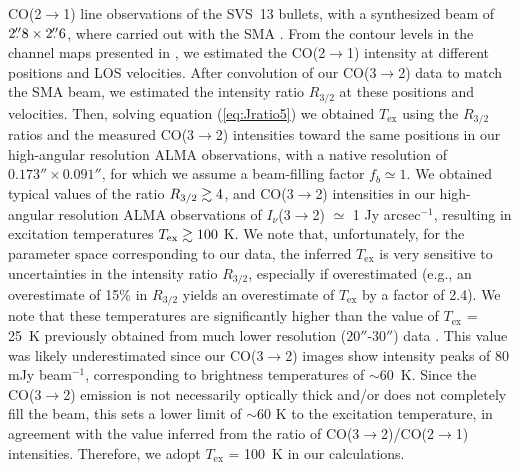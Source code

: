 \documentclass[12pt]{mythesis}
\begin{document}
CO(2$\rightarrow$1) line observations of the SVS~13 bullets, with a synthesized beam of $2\mbox{$.\!\!^{\prime\prime}$} 8 \times 2\mbox{$.\!\!^{\prime\prime}$} 6$, where carried out with the SMA \citep{chen2016}.
From the contour levels in the channel maps presented in \citet{chen2016}, we estimated the CO(2$\rightarrow$1) intensity at different positions and LOS velocities. After convolution of our CO(3$\rightarrow$2) data to match the SMA beam, we estimated the intensity ratio $R_{3/2}$ at these positions and velocities. Then, solving equation (\ref{eq:Jratio5}) we obtained $T_\mathrm{ex}$ using the $R_{3/2}$ ratios and the measured CO(3$\rightarrow$2) intensities toward the same positions in our high-angular resolution ALMA observations, with a native resolution of $0.173''\times0.091''$, for which we assume a beam-filling factor $f_b\simeq1$. We obtained typical values of the ratio $R_{3/2} \gtrsim 4$, and CO(3$\rightarrow$2) intensities in our high-angular resolution ALMA observations of $I_\nu$(3$\rightarrow$2) $\simeq$ 1 Jy arcsec$^{-1}$, resulting in excitation temperatures $T_\mathrm{ex} \gtrsim 100$ K. We note that, unfortunately, for the parameter space corresponding to our data, the inferred $T_\mathrm{ex}$ is very sensitive to uncertainties in the intensity ratio $R_{3/2}$, especially if overestimated (e.g., an overestimate of 15\% in $R_{3/2}$ yields an overestimate of $T_\mathrm{ex}$ by a factor of 2.4).
We note that these temperatures are significantly higher than the value of $T_\mathrm{ex}$ = 25~K previously obtained from much lower resolution ($20''$-$30''$) data \citep{masson1990}. This value was likely underestimated since our CO(3$\rightarrow$2) images show intensity peaks of 80 mJy beam$^{-1}$, corresponding to brightness temperatures of $\sim$60~K. Since the CO(3$\rightarrow$2) emission is not necessarily optically thick and/or does not completely fill the beam, this sets a lower limit of $\sim$60 K to the excitation temperature, in agreement with the value inferred from the ratio of CO(3$\rightarrow$2)/CO(2$\rightarrow$1) intensities. Therefore, we adopt $T_\mathrm{ex}$ = 100~K in our calculations.
\end{document}
